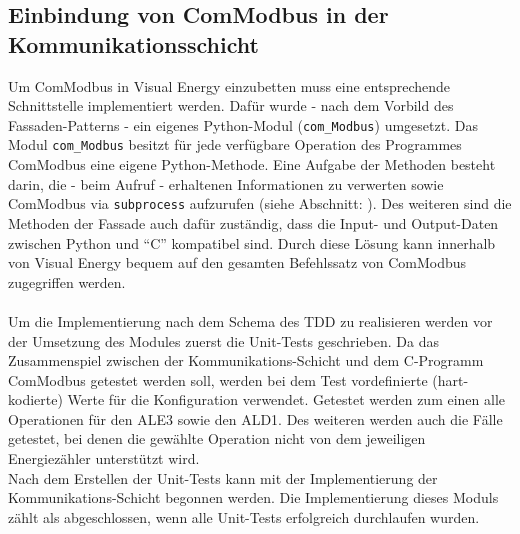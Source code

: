\documentclass[Bachelorarbeit.tex]{subfiles}
\begin{document}
\subsection{Einbindung von ComModbus in der Kommunikationsschicht}
Um ComModbus in Visual Energy einzubetten muss eine entsprechende Schnittstelle implementiert werden.
Dafür wurde -  nach dem Vorbild des Fassaden-Patterns - ein eigenes Python-Modul (\texttt{com\_Modbus}) umgesetzt. 
Das Modul \texttt{com\_Modbus} besitzt für jede verfügbare Operation des Programmes ComModbus eine eigene Python-Methode. 
Eine Aufgabe der Methoden besteht darin, die - beim Aufruf - erhaltenen Informationen zu verwerten sowie ComModbus via \texttt{subprocess} aufzurufen (siehe Abschnitt: ). 
Des weiteren sind die Methoden der Fassade auch dafür zuständig, dass die Input- und Output-Daten zwischen Python und "`C"' kompatibel sind.
Durch diese Lösung kann innerhalb von Visual Energy bequem auf den gesamten Befehlssatz von ComModbus zugegriffen werden.   \\
\\
Um die Implementierung nach dem Schema des \ac{TDD} zu realisieren werden vor der Umsetzung des Modules zuerst die Unit-Tests geschrieben. 
Da das Zusammenspiel zwischen der Kommunikations-Schicht und dem C-Programm ComModbus getestet werden soll, werden bei dem Test vordefinierte (hart-kodierte) Werte für die Konfiguration verwendet. 
Getestet werden zum einen alle Operationen für den \acs{ALE3} sowie den \acs{ALD1}. Des weiteren werden  auch die Fälle getestet, bei denen die gewählte Operation nicht von dem jeweiligen Energiezähler unterstützt wird.\\
Nach dem Erstellen der Unit-Tests kann mit der Implementierung der Kommunikations-Schicht begonnen werden. 
Die Implementierung dieses Moduls zählt als abgeschlossen, wenn alle Unit-Tests erfolgreich durchlaufen wurden.
\end{document}
